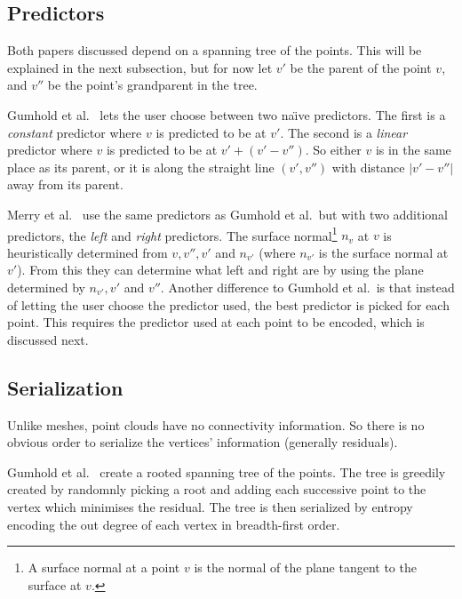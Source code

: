 \documentclass[11pt,twocolumn]{article}
\begin{document}
\subsection{Predictors}

Both papers discussed depend on a spanning tree of the points. This will be
explained in the next subsection, but for now let $v'$ be the parent of the
point $v$, and $v''$ be the point's grandparent in the tree.

Gumhold et al.~\cite{gumholdcomp} lets the user choose between two na\"{\i}ve
predictors. The first is a \emph{constant} predictor where $v$ is predicted to
be at $v'$. The second is a \emph{linear} predictor where $v$ is predicted to
be at $v' + (v' - v'')$. So either $v$ is in the same place as its parent, or
it is along the straight line $(v', v'')$ with distance $|v'-v''|$ away from
its parent.

Merry et al.~\cite{merrycomp} use the same predictors as Gumhold et al.\ but
with two additional predictors, the \emph{left} and \emph{right}
predictors. The surface normal\footnote{A surface normal at a point $v$ is the
  normal of the plane tangent to the surface at $v$.} $n_v$ at $v$ is
heuristically determined from $v, v'', v'$ and $n_{v'}$ (where $n_{v'}$ is the
surface normal at $v'$). From this they can determine what left and right are
by using the plane determined by $n_{v'}, v'$ and $v''$. Another difference to
Gumhold et al.\ is that instead of letting the user choose the predictor used,
the best predictor is picked for each point. This requires the predictor used
at each point to be encoded, which is discussed next.


\subsection{Serialization}

Unlike meshes, point clouds have no connectivity information. So there is no
obvious order to serialize the vertices' information (generally residuals).

Gumhold et al.~\cite{gumholdcomp} create a rooted spanning tree of the
points. The tree is greedily created by randomnly picking a root and adding
each successive point to the vertex which minimises the residual. The tree is
then serialized by entropy encoding the out degree of each vertex in
breadth-first order.
\end{document}
